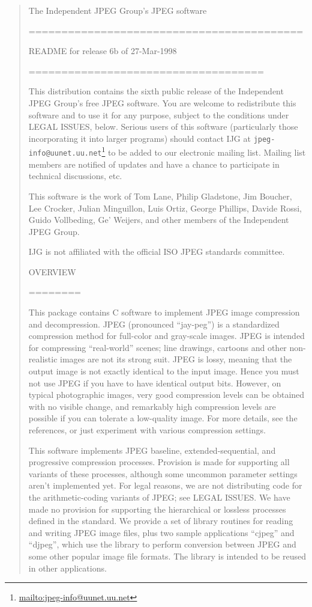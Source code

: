 \documentclass[
]{book}
\DeclareRobustCommand{\href}[2]{#2\footnote{\url{#1}}}
\theoremstyle{definition}
\theoremstyle{definition}
\theoremstyle{definition}
\theoremstyle{definition}
\theoremstyle{remark}
\begin{document}
\begin{quote}
The Independent JPEG Group's JPEG software

==========================================

README for release 6b of 27-Mar-1998

====================================

This distribution contains the sixth public release of the Independent JPEG
Group's free JPEG software. You are welcome to redistribute this software and
to use it for any purpose, subject to the conditions under LEGAL ISSUES, below.
Serious users of this software (particularly those incorporating it into
larger programs) should contact IJG at \href{mailto:jpeg-info@uunet.uu.net}{\nolinkurl{jpeg-info@uunet.uu.net}} to be added to
our electronic mailing list. Mailing list members are notified of updates
and have a chance to participate in technical discussions, etc.

This software is the work of Tom Lane, Philip Gladstone, Jim Boucher,
Lee Crocker, Julian Minguillon, Luis Ortiz, George Phillips, Davide Rossi,
Guido Vollbeding, Ge' Weijers, and other members of the Independent JPEG
Group.

IJG is not affiliated with the official ISO JPEG standards committee.

OVERVIEW

========

This package contains C software to implement JPEG image compression and
decompression. JPEG (pronounced ``jay-peg'') is a standardized compression
method for full-color and gray-scale images. JPEG is intended for compressing
``real-world'' scenes; line drawings, cartoons and other non-realistic images
are not its strong suit. JPEG is lossy, meaning that the output image is not
exactly identical to the input image. Hence you must not use JPEG if you
have to have identical output bits. However, on typical photographic images,
very good compression levels can be obtained with no visible change, and
remarkably high compression levels are possible if you can tolerate a
low-quality image. For more details, see the references, or just experiment
with various compression settings.

This software implements JPEG baseline, extended-sequential, and progressive
compression processes. Provision is made for supporting all variants of these
processes, although some uncommon parameter settings aren't implemented yet.
For legal reasons, we are not distributing code for the arithmetic-coding
variants of JPEG; see LEGAL ISSUES. We have made no provision for supporting
the hierarchical or lossless processes defined in the standard.
We provide a set of library routines for reading and writing JPEG image files,
plus two sample applications ``cjpeg'' and ``djpeg'', which use the library to
perform conversion between JPEG and some other popular image file formats.
The library is intended to be reused in other applications.


\end{quote}
\end{document}
